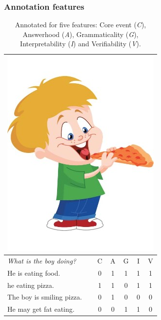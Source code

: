 \documentclass[handout,xcolor={dvipsnames}]{beamer}
\begin{document}
\begin{frame}
\frametitle{Annotation features}
\begin{table}[htb!]
\small
\begin{center}
\begin{tabular}{|l|c|c|c|c|c|}
\hline
\multicolumn{6}{|c|}{\includegraphics[width=0.25\columnwidth]{figures/I02.jpg}} \\
\hline
\textit{What is the boy doing?} & C & A & G & I & V \\
\hline
\hline
He is eating food. & 0 & 1 & 1 & 1 & 1 \\
\hline
he eating pizza. & 1 & 1 & 0 & 1 & 1 \\
\hline
The boy is smiling pizza. & 0 & 1 & 0 & 0 & 0 \\
\hline
He may get fat eating. & 0 & 0 & 1 & 1 & 0 \\
\hline
\end{tabular}
\caption{\label{tab:dev-transitive} \small Annotated for five features: Core event (\textit{C}), Answerhood (\textit{A}), Grammaticality (\textit{G}), Interpretability (\textit{I}) and Verifiability (\textit{V}).}
\end{center}
\end{table}
\end{frame}
\end{document}
